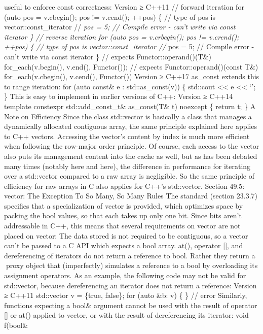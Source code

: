 useful to enforce const correctness: Version ≥ C++11 // forward
iteration for (auto pos = v.cbegin(); pos != v.cend(); ++pos) \{ // type
of pos is vector::const\_iterator // \emph{pos = 5; // Compile error -
can't write via const iterator \} // reverse iteration for (auto pos =
v.crbegin(); pos != v.crend(); ++pos) \{ // type of pos is
vector::const\_iterator // }pos = 5; // Compile error - can't write via
const iterator \} // expects Functor::operand()(T\&)
for\_each(v.begin(), v.end(), Functor()); // expects
Functor::operand()(const T\&) for\_each(v.cbegin(), v.cend(), Functor())
Version ≥ C++17 as\_const extends this to range iteration: for (auto
const\& e : std::as\_const(v)) \{ std::cout \textless\textless{} e
\textless\textless{} `\n'; \} This is easy to implement in earlier
versions of C++: Version ≥ C++14 template constexpr std::add\_const\_t\&
as\_const(T\& t) noexcept \{ return t; \} A Note on Eﬃciency Since the
class std::vector is basically a class that manages a dynamically
allocated contiguous array, the same principle explained here applies to
C++ vectors. Accessing the vector's content by index is much more
eﬃcient when following the row-major order principle. Of course, each
access to the vector also puts its management content into the cache as
well, but as has been debated many times (notably here and here), the
diﬀerence in performance for iterating over a std::vector compared to a
raw array is negligible. So the same principle of eﬃciency for raw
arrays in C also applies for C++'s std::vector. Section 49.5: vector:
The Exception To So Many, So Many Rules The standard (section 23.3.7)
speciﬁes that a specialization of vector is provided, which optimizes
space by packing the bool values, so that each takes up only one bit.
Since bits aren't addressable in C++, this means that several
requirements on vector are not placed on vector: The data stored is not
required to be contiguous, so a vector can't be passed to a C API which
expects a bool array. at(), operator {[}{]}, and dereferencing of
iterators do not return a reference to bool. Rather they return a proxy
object that (imperfectly) simulates a reference to a bool by overloading
its assignment operators. As an example, the following code may not be
valid for std::vector, because dereferencing an iterator does not return
a reference: Version ≥ C++11 std::vector v = \{true, false\}; for (auto
\&b: v) \{ \} // error Similarly, functions expecting a bool\& argument
cannot be used with the result of operator {[}{]} or at() applied to
vector, or with the result of dereferencing its iterator: void f(bool\&
